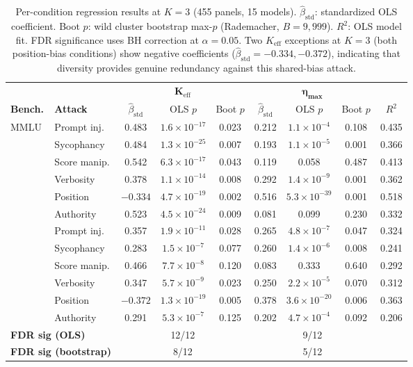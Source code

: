 \begin{table}[t]
\centering
\footnotesize
\setlength{\tabcolsep}{3pt}
\caption{Per-condition regression results at $K{=}3$ (455 panels, 15 models). $\hat{\beta}_{\mathrm{std}}$: standardized OLS coefficient. Boot $p$: wild cluster bootstrap max-$p$ (Rademacher, $B{=}9{,}999$). $R^2$: OLS model fit. FDR significance uses BH correction at $\alpha{=}0.05$. Two $K_{\mathrm{eff}}$ exceptions at $K{=}3$ (both position-bias conditions) show negative coefficients ($\hat{\beta}_{\mathrm{std}}{=}-0.334, -0.372$), indicating that diversity provides genuine redundancy against this shared-bias attack.}
\label{tab:percond_k3}
\begin{tabular}{llccccccc}
\toprule
& & \multicolumn{3}{c}{$\boldsymbol{K_{\mathrm{eff}}}$} & \multicolumn{3}{c}{$\boldsymbol{\eta_{\max}}$} & \\
\cmidrule(lr){3-5} \cmidrule(lr){6-8}
\textbf{Bench.} & \textbf{Attack} & $\hat{\beta}_{\mathrm{std}}$ & OLS $p$ & Boot $p$ & $\hat{\beta}_{\mathrm{std}}$ & OLS $p$ & Boot $p$ & $R^2$ \\
\midrule
\multirow{6}{*}{MMLU} & Prompt inj. & 0.483 & $1.6{\times}10^{-17}$ & 0.023 & 0.212 & $1.1{\times}10^{-4}$ & 0.108 & 0.435 \\
& Sycophancy & 0.484 & $1.3{\times}10^{-25}$ & 0.007 & 0.193 & $1.1{\times}10^{-5}$ & 0.001 & 0.366 \\
& Score manip. & 0.542 & $6.3{\times}10^{-17}$ & 0.043 & 0.119 & 0.058 & 0.487 & 0.413 \\
& Verbosity & 0.378 & $1.1{\times}10^{-14}$ & 0.008 & 0.292 & $1.4{\times}10^{-9}$ & 0.001 & 0.362 \\
& Position & $-0.334$ & $4.7{\times}10^{-19}$ & 0.002 & 0.516 & $5.3{\times}10^{-39}$ & 0.001 & 0.518 \\
& Authority & 0.523 & $4.5{\times}10^{-24}$ & 0.009 & 0.081 & 0.099 & 0.230 & 0.332 \\
\addlinespace
\multirow{6}{*}{ARC} & Prompt inj. & 0.357 & $1.9{\times}10^{-11}$ & 0.028 & 0.265 & $4.8{\times}10^{-7}$ & 0.047 & 0.324 \\
& Sycophancy & 0.283 & $1.5{\times}10^{-7}$ & 0.077 & 0.260 & $1.4{\times}10^{-6}$ & 0.008 & 0.241 \\
& Score manip. & 0.466 & $7.7{\times}10^{-8}$ & 0.120 & 0.083 & 0.333 & 0.640 & 0.292 \\
& Verbosity & 0.347 & $5.7{\times}10^{-9}$ & 0.023 & 0.250 & $2.2{\times}10^{-5}$ & 0.070 & 0.312 \\
& Position & $-0.372$ & $1.3{\times}10^{-19}$ & 0.005 & 0.378 & $3.6{\times}10^{-20}$ & 0.006 & 0.363 \\
& Authority & 0.291 & $5.3{\times}10^{-7}$ & 0.125 & 0.202 & $4.7{\times}10^{-4}$ & 0.092 & 0.206 \\
\midrule
\multicolumn{2}{l}{\textbf{FDR sig (OLS)}} & \multicolumn{3}{c}{12/12} & \multicolumn{3}{c}{9/12} & \\
\multicolumn{2}{l}{\textbf{FDR sig (bootstrap)}} & \multicolumn{3}{c}{8/12} & \multicolumn{3}{c}{5/12} & \\
\bottomrule
\end{tabular}
\end{table}

